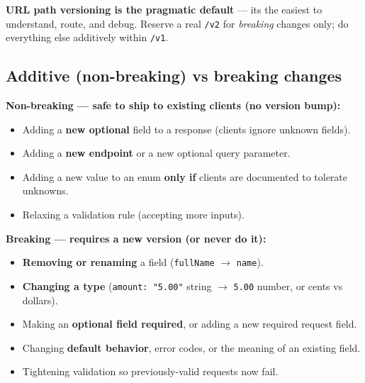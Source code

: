 \documentclass[11pt]{article}
\providecommand{\tightlist}{\setlength{\itemsep}{1pt}\setlength{\parskip}{0pt}}
\begin{document}
\textbf{URL path versioning is the pragmatic default} --- it\textquotesingle s the easiest to understand, route, and debug. Reserve a real \texttt{/v2} for \emph{breaking} changes only; do everything else additively within \texttt{/v1}.

\subsection{Additive (non-breaking) vs breaking changes}\label{additive-non-breaking-vs-breaking-changes}

\textbf{Non-breaking --- safe to ship to existing clients (no version bump):}

\begin{itemize}
\tightlist
\item
  Adding a \textbf{new optional} field to a response (clients ignore unknown fields).
\item
  Adding a \textbf{new endpoint} or a new optional query parameter.
\item
  Adding a new value to an enum \textbf{only if} clients are documented to tolerate unknowns.
\item
  Relaxing a validation rule (accepting more inputs).
\end{itemize}

\textbf{Breaking --- requires a new version (or never do it):}

\begin{itemize}
\tightlist
\item
  \textbf{Removing or renaming} a field (\texttt{fullName} \(\rightarrow\) \texttt{name}).
\item
  \textbf{Changing a type} (\texttt{amount:\ "5.00"} string \(\rightarrow\) \texttt{5.00} number, or cents vs dollars).
\item
  Making an \textbf{optional field required}, or adding a new required request field.
\item
  Changing \textbf{default behavior}, error codes, or the meaning of an existing field.
\item
  Tightening validation so previously-valid requests now fail.
\end{itemize}

\end{document}
